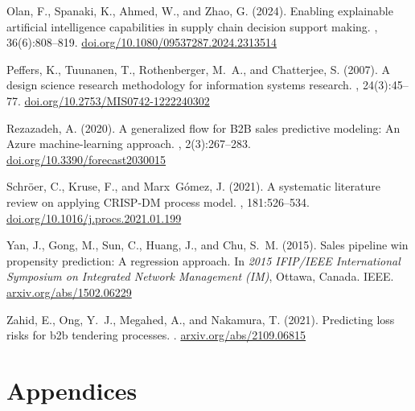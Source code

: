 \documentclass[12pt,oneside]{report}
\begin{document}
\begin{thebibliography}{}
Olan, F., Spanaki, K., Ahmed, W., and Zhao, G. (2024).
\newblock Enabling explainable artificial intelligence capabilities in supply
  chain decision support making.
, 36(6):808--819.
\newblock \href{https://doi.org/10.1080/09537287.2024.2313514}{doi.org/10.1080/09537287.2024.2313514}

Peffers, K., Tuunanen, T., Rothenberger, M.~A., and Chatterjee, S. (2007).
\newblock A design science research methodology for information systems
  research.
, 24(3):45--77.
\newblock \href{https://doi.org/10.2753/MIS0742-1222240302}{doi.org/10.2753/MIS0742-1222240302}

Rezazadeh, A. (2020).
\newblock A generalized flow for {B2B} sales predictive modeling: An {Azure}
  machine-learning approach.
, 2(3):267--283.
\newblock \href{https://doi.org/10.3390/forecast2030015}{doi.org/10.3390/forecast2030015}

Schr{\"o}er, C., Kruse, F., and Marx~G{\'o}mez, J. (2021).
\newblock A systematic literature review on applying {CRISP-DM} process model.
, 181:526--534.
\newblock \href{https://doi.org/10.1016/j.procs.2021.01.199}{doi.org/10.1016/j.procs.2021.01.199}

Yan, J., Gong, M., Sun, C., Huang, J., and Chu, S.~M. (2015).
\newblock Sales pipeline win propensity prediction: A regression approach.
\newblock In {\em 2015 IFIP/IEEE International Symposium on Integrated Network
  Management (IM)}, Ottawa, Canada. IEEE.
\newblock \href{https://arxiv.org/abs/1502.06229}{arxiv.org/abs/1502.06229}

Zahid, E., Ong, Y.~J., Megahed, A., and Nakamura, T. (2021).
\newblock Predicting loss risks for b2b tendering processes.
.
\newblock \href{https://arxiv.org/abs/2109.06815}{arxiv.org/abs/2109.06815}

\end{thebibliography}

\hypertarget{appendices}{%
\chapter*{Appendices}\label{appendices}}
\end{document}
